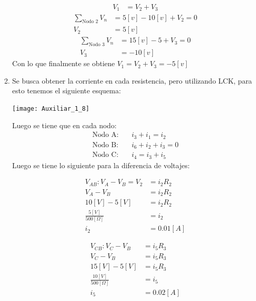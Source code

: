 \documentclass[
  11pt,
  letterpaper,
   addpoints,
  ]{exam}
\begin{document}
\begin{questions}
\begin{solution}
\begin{enumerate}
\begin{align}
        V_{1} &= V_{2} + V_{3}
    \end{align}
    \begin{align}
        \sum_{\text{Nodo 2}} V_{n} &= 5[v] - 10[v] + V_{2} = 0\\
        V_{2} &= 5[v]
    \end{align}
    \begin{align}
        \sum_{\text{Nodo 3}} V_{n} &= 15[v] - 5 + V_{3} = 0\\
        V_{3} &= -10[v]
    \end{align}
    Con lo que finalmente se obtiene $V_1 = V_2 + V_3 = -5[v]$
    \item Se busca obtener la corriente en cada resistencia, pero utilizando LCK, para esto tenemos el siguiente esquema:
    \begin{center}
        \texttt{[image: Auxiliar\_1\_8]}
    \end{center}
    Luego se tiene que en cada nodo:
    \begin{align}
    \text{Nodo A:} \quad & i_3 + i_1 = i_2 \\
    \text{Nodo B:} \quad & i_6 + i_2 + i_3 = 0 \\
    \text{Nodo C:} \quad & i_4 = i_3 + i_5
    \end{align}
    Luego se tiene lo siguiente para la diferencia de voltajes:
    \begin{multicols}{2} %

        \begin{align*}
            V_{AB}: V_A - V_B = V_2 &= i_2 R_2 \\
            V_A - V_B &= i_2 R_2 \\
            10[V] - 5[V] &= i_2 R_2 \\
            \frac{5[V]}{500[\Omega]} &= i_2 \\
            i_2 &= 0.01[A]
        \end{align*}
    
        \begin{align*}
            V_{CB} : V_C - V_B &= i_5 R_3 \\
            V_C - V_B &= i_5 R_3 \\
            15[V] - 5[V] &= i_5 R_3 \\
            \frac{10[V]}{500[\Omega]} &= i_5 \\
            i_5 &= 0.02[A]
        \end{align*}
    

\end{multicols}
\end{enumerate}
\end{solution}
\end{questions}
\end{document}
